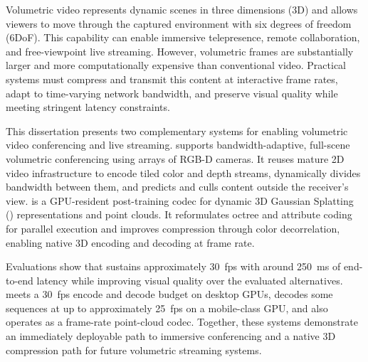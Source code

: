 Volumetric video represents dynamic scenes in three dimensions (3D) and allows viewers to move through the captured environment with six degrees of freedom (6DoF). 
%
This capability can enable immersive telepresence, remote collaboration, and free-viewpoint live streaming. 
%
However, volumetric frames are substantially larger and more computationally expensive than conventional video.
%
Practical systems must compress and transmit this content at interactive frame rates, adapt to time-varying network bandwidth, and preserve visual quality while meeting stringent latency constraints.

This dissertation presents two complementary systems for enabling volumetric video conferencing and live streaming.
%
\livo supports bandwidth-adaptive, full-scene volumetric conferencing using arrays of RGB-D cameras. 
%
It reuses mature 2D video infrastructure to encode tiled color and depth streams, dynamically divides bandwidth between them, and predicts and culls content outside the receiver's view. 
%
\gsnfs is a GPU-resident post-training codec for dynamic 3D Gaussian Splatting (\dgs) representations and point clouds. 
%
It reformulates octree and attribute coding for parallel execution and improves compression through color decorrelation, enabling native 3D encoding and decoding at frame rate.
%

Evaluations show that \livo sustains approximately 30~fps with around 250~ms of end-to-end latency while improving visual quality over the evaluated alternatives. 
%
\gsnfs meets a 30~fps encode and decode budget on desktop GPUs, decodes some sequences at up to approximately 25~fps on a mobile-class GPU, and also operates as a frame-rate point-cloud codec. 
%
Together, these systems demonstrate an immediately deployable path to immersive conferencing and a native 3D compression path for future volumetric streaming systems.
